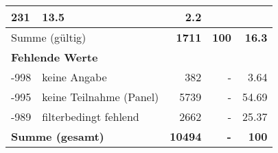 \begin{longtable}{lXrrr}
       \num{231} &
       \num[round-mode=places,round-precision=2]{13,5} &
         \num[round-mode=places,round-precision=2]{2,2} \\
     \midrule
     \multicolumn{2}{l}{Summe (gültig)} &
       \textbf{\num{1711}} &
     \textbf{100} &
       \textbf{\num[round-mode=places,round-precision=2]{16,3}} \\
     \multicolumn{5}{l}{\textbf{Fehlende Werte}}\\
       -998 &
       keine Angabe &
         \num{382} &
        - &
         \num[round-mode=places,round-precision=2]{3,64} \\
       -995 &
       keine Teilnahme (Panel) &
         \num{5739} &
        - &
         \num[round-mode=places,round-precision=2]{54,69} \\
       -989 &
       filterbedingt fehlend &
         \num{2662} &
        - &
         \num[round-mode=places,round-precision=2]{25,37} \\
     \midrule
     \multicolumn{2}{l}{\textbf{Summe (gesamt)}} &
          \textbf{\num{10494}} &
        \textbf{-} &
        \textbf{100} \\
     \bottomrule
     \end{longtable}
     
